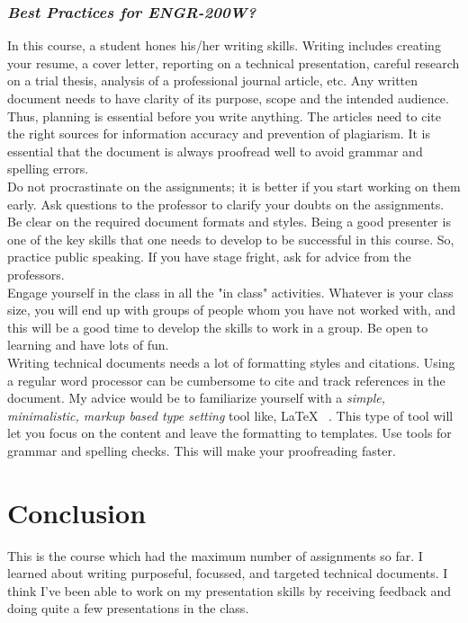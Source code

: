 \documentclass[letterpaper,12pt]{texMemo}
\begin{document}
\begin{singlespacing}
\subsubsection*{\textit{Best Practices for ENGR-200W?}}
In this course, a student hones his/her writing skills. Writing includes creating your resume, a cover letter, reporting on a technical presentation, careful research on a trial thesis, analysis of a professional journal article, etc. Any written document needs to have clarity of its purpose, scope and the intended audience. Thus, planning is essential before you write anything. The articles need to cite the right sources for information accuracy and prevention of plagiarism. It is essential that the document is always proofread well to avoid grammar and spelling errors.\\ 
Do not procrastinate on the assignments; it is better if you start working on them early. Ask questions to the professor to clarify your doubts on the assignments. Be clear on the required document formats and styles. Being a good presenter is one of the key skills that one needs to develop to be successful in this course. So, practice public speaking. If you have stage fright, ask for advice from the professors.\\ 
Engage yourself in the class in all the "in class" activities. Whatever is your class size, you will end up with groups of people whom you have not worked with, and this will be a good time to develop the skills to work in a group. Be open to learning and have lots of fun. \\
Writing technical documents needs a lot of formatting styles and citations. Using a regular word processor can be cumbersome to cite and track references in the document. My advice would be to familiarize yourself with a \textit{simple, minimalistic, markup based type setting} tool like, \LaTeX{} ~\citep{LaTeXAdo7:online}. This type of tool will let you focus on the content and leave the formatting to templates. Use tools for grammar and spelling checks. This will make your proofreading faster. 

\section*{Conclusion}
This is the course which had the maximum number of assignments so far. I learned about writing purposeful, focussed, and targeted technical documents. I think I've been able to work on my presentation skills by receiving feedback and doing quite a few presentations in the class. 



\end{singlespacing}
\end{document}
